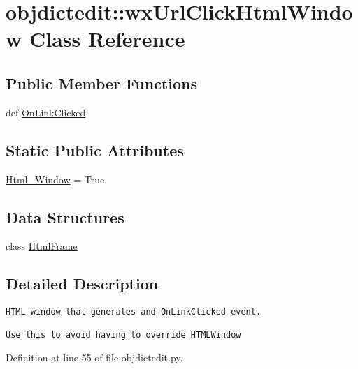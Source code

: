 \hypertarget{classobjdictedit_1_1wxUrlClickHtmlWindow}{
\section{objdictedit::wx\-Url\-Click\-Html\-Window Class Reference}
\label{classobjdictedit_1_1wxUrlClickHtmlWindow}
}
\subsection*{Public Member Functions}
\begin{CompactItemize}
\item 
def \hyperlink{classobjdictedit_1_1wxUrlClickHtmlWindow_7cd4af390c2de4ed45de931373d756f0}{On\-Link\-Clicked}
\end{CompactItemize}
\subsection*{Static Public Attributes}
\begin{CompactItemize}
\item 
\hyperlink{classobjdictedit_1_1wxUrlClickHtmlWindow_1de5f92921afa89cfe93fe8a6837dedb}{Html\_\-Window} = True
\end{CompactItemize}
\subsection*{Data Structures}
\begin{CompactItemize}
\item 
class \hyperlink{classobjdictedit_1_1wxUrlClickHtmlWindow_1_1HtmlFrame}{Html\-Frame}
\end{CompactItemize}


\subsection{Detailed Description}


\footnotesize\begin{verbatim}HTML window that generates and OnLinkClicked event.

Use this to avoid having to override HTMLWindow
\end{verbatim}
\normalsize
 



Definition at line 55 of file objdictedit.py.

